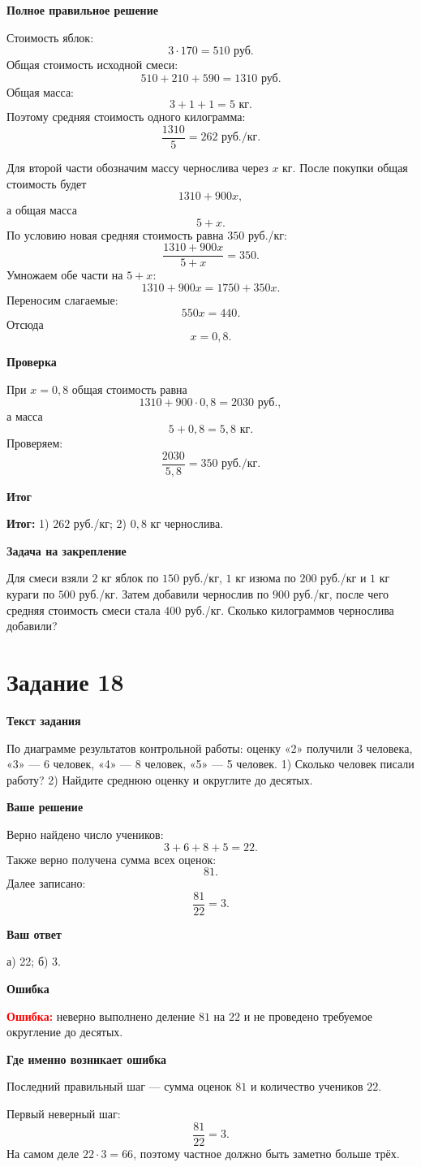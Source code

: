 \documentclass[12pt,a4paper]{article}
\newcommand{\errorlabel}{\textcolor{red}{\textbf{Ошибка:}}}
\newcommand{\resultlabel}{\textcolor{teal!60!black}{\textbf{Итог:}}}
\newcommand{\subhead}[1]{\par\medskip\textbf{#1}\par}
\begin{document}
\subhead{Полное правильное решение}
Стоимость яблок:
\[
3\cdot170=510\text{ руб.}
\]
Общая стоимость исходной смеси:
\[
510+210+590=1310\text{ руб.}
\]
Общая масса:
\[
3+1+1=5\text{ кг}.
\]
Поэтому средняя стоимость одного килограмма:
\[
\frac{1310}{5}=262\text{ руб./кг}.
\]

Для второй части обозначим массу чернослива через $x$ кг. После покупки общая стоимость будет
\[
1310+900x,
\]
а общая масса
\[
5+x.
\]
По условию новая средняя стоимость равна $350$ руб./кг:
\[
\frac{1310+900x}{5+x}=350.
\]
Умножаем обе части на $5+x$:
\[
1310+900x=1750+350x.
\]
Переносим слагаемые:
\[
550x=440.
\]
Отсюда
\[
x=0{,}8.
\]

\subhead{Проверка}
При $x=0{,}8$ общая стоимость равна
\[
1310+900\cdot0{,}8=2030\text{ руб.},
\]
а масса
\[
5+0{,}8=5{,}8\text{ кг}.
\]
Проверяем:
\[
\frac{2030}{5{,}8}=350\text{ руб./кг}.
\]

\subhead{Итог}
\resultlabel{} 1) $262$ руб./кг; 2) $0{,}8$ кг чернослива.

\subhead{Задача на закрепление}
Для смеси взяли $2$ кг яблок по $150$ руб./кг, $1$ кг изюма по $200$ руб./кг и $1$ кг кураги по $500$ руб./кг. Затем добавили чернослив по $900$ руб./кг, после чего средняя стоимость смеси стала $400$ руб./кг. Сколько килограммов чернослива добавили?

\newpage
{}\label{task:18}
\section*{Задание 18}

\subhead{Текст задания}
По диаграмме результатов контрольной работы: оценку «2» получили 3 человека, «3» --- 6 человек, «4» --- 8 человек, «5» --- 5 человек. 1) Сколько человек писали работу? 2) Найдите среднюю оценку и округлите до десятых.

\subhead{Ваше решение}
Верно найдено число учеников:
\[
3+6+8+5=22.
\]
Также верно получена сумма всех оценок:
\[
81.
\]
Далее записано:
\[
\frac{81}{22}=3.
\]

\subhead{Ваш ответ}
а) 22; б) 3.

\subhead{Ошибка}
\errorlabel{} неверно выполнено деление $81$ на $22$ и не проведено требуемое округление до десятых.

\subhead{Где именно возникает ошибка}
Последний правильный шаг --- сумма оценок $81$ и количество учеников $22$.

Первый неверный шаг:
\[
\frac{81}{22}=3.
\]
На самом деле $22\cdot3=66$, поэтому частное должно быть заметно больше трёх.
\end{document}
